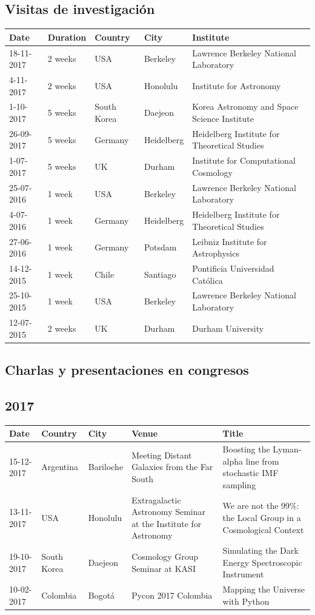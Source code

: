 \documentclass{article}
\begin{document}
\subsection{Visitas de investigaci\'on}
\begin{tabular}{p{1.7cm} p{1.3cm} p{2.0cm} p{1.5cm} p{7.0cm}}\hline
Date & Duration & Country & City & Institute\\\hline
18-11-2017 & 2 weeks & USA & Berkeley & Lawrence Berkeley National Laboratory\\
4-11-2017 & 2 weeks & USA & Honolulu & Institute for Astronomy\\
1-10-2017 & 5 weeks & South Korea & Daejeon & Korea Astronomy and Space Science Institute \\
26-09-2017 & 5 weeks & Germany & Heidelberg & Heidelberg Institute for Theoretical Studies\\
1-07-2017 & 5 weeks & UK & Durham & Institute for Computational Cosmology\\
25-07-2016 & 1 week & USA & Berkeley & Lawrence Berkeley National Laboratory\\
4-07-2016 & 1 week & Germany & Heidelberg & Heidelberg Institute for Theoretical Studies \\
27-06-2016 & 1 week & Germany & Potsdam & Leibniz Institute for Astrophysics \\
14-12-2015 & 1 week & Chile & Santiago & Pontificia Universidad Cat\'olica\\
25-10-2015 & 1 week & USA & Berkeley & Lawrence Berkeley National Laboratory\\
12-07-2015 & 2 weeks & UK & Durham & Durham University\\\hline
\end{tabular}

\subsection{Charlas y presentaciones en congresos}

\subsection*{2017}
\noindent
\begin{tabular}{p{2.0cm} p{1.5cm} p{1.5cm} p{5.0cm} p{5.0cm}}\hline
Date & Country & City& Venue & Title\\\hline
15-12-2017 & Argentina & Bariloche & Meeting Distant Galaxies from the
Far South & Boosting the Lyman-alpha line from stochastic IMF sampling\\
13-11-2017 & USA & Honolulu & Extragalactic Astronomy Seminar at the Institute for Astronomy & We are not the 99\%: the Local Group in a Cosmological Context\\
19-10-2017 & South Korea & Daejeon & Cosmology Group Seminar at KASI & Simulating the Dark Energy Spectroscopic Instrument\\
10-02-2017 & Colombia & Bogot\'a & Pycon 2017 Colombia & Mapping the Universe with Python\\
\end{tabular}
\end{document}
